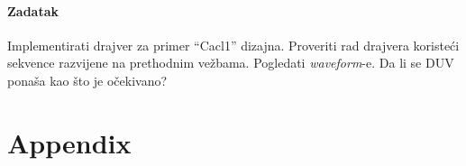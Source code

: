 \paragraph{Zadatak}

Implementirati drajver za primer ``Cacl1'' dizajna. Proveriti rad drajvera
koristeći sekvence razvijene na prethodnim vežbama. Pogledati \emph{waveform}-e.
Da li se DUV ponaša kao što je očekivano?


\section{Appendix}


















